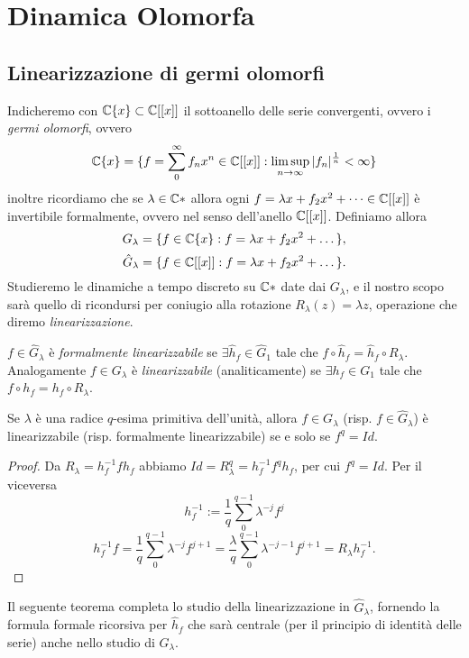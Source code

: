 \section{Dinamica Olomorfa}

\subsection{Linearizzazione di germi olomorfi}
Indicheremo con $\mathbb{C}\{x\}\subset\mathbb{C}[[x]]$ il sottoanello delle serie convergenti, ovvero i \emph{germi olomorfi}, ovvero
\[\mathbb{C}\{x\}=\{ f=\sum_0^\infty f_n x^n\in \mathbb{C}[[x]]:\limsup_{n\rightarrow \infty}|f_n|^\frac{1}{n}<\infty \}\]
inoltre ricordiamo che se $\lambda\in\mathbb{C}*$ allora ogni $f=\lambda x+f_2 x^2+\dots \in \mathbb{C}[[x]]$ è invertibile formalmente, ovvero nel senso dell'anello $\mathbb{C}[[x]]$. Definiamo allora
\[G_\lambda=\{f\in\mathbb{C}\{x\}:f=\lambda x+f_2 x^2+\dots\},\]
\[\hat G_\lambda=\{f\in\mathbb{C}[[x]]:f=\lambda x+f_2 x^2+\dots\}.\]
Studieremo le dinamiche a tempo discreto su $\mathbb{C}*$ date dai $G_\lambda$, e il nostro scopo sarà quello di ricondursi per coniugio alla rotazione $R_\lambda(z)=\lambda z$, operazione che diremo \emph{linearizzazione}.

\begin{defi} $f\in \hat G_\lambda$ è \emph{formalmente linearizzabile} se $\exists \hat h_f\in \hat G_1$ tale che $f\circ\hat h_f=\hat h_f\circ R_\lambda$. Analogamente $f\in G_\lambda$ è \emph{linearizzabile} (analiticamente) se $\exists h_f\in G_1$ tale che $f\circ h_f= h_f\circ R_\lambda$. 
\end{defi}

\begin{teo}Se $\lambda$ è una radice $q$-esima primitiva dell'unità, allora $f\in G_\lambda$ (risp. $f\in \hat G_\lambda$) è linearizzabile (risp. formalmente linearizzabile) se e solo se $f^q=Id$.\end{teo}
\begin{proof}
 Da $R_\lambda=h_f^{-1}fh_f$ abbiamo $Id=R_\lambda^q=h_f^{-1}f^qh_f$, per cui $f^q=Id$. Per il viceversa
 \[h_f^{-1}:=\frac{1}{q}\sum_0^{q-1}\lambda^{-j}f^j\]
 \[h_f^{-1}f=\frac{1}{q}\sum_0^{q-1}\lambda^{-j}f^{j+1}=\frac{\lambda}{q}\sum_0^{q-1}\lambda^{-j-1}f^{j+1}=R_\lambda h_f^{-1}.\]
\end{proof}

Il seguente teorema completa lo studio della linearizzazione in $\hat G_\lambda$, fornendo la formula formale ricorsiva per $\hat h_f$ che sarà centrale (per il principio di identità delle serie) anche nello studio di $G_\lambda$.

